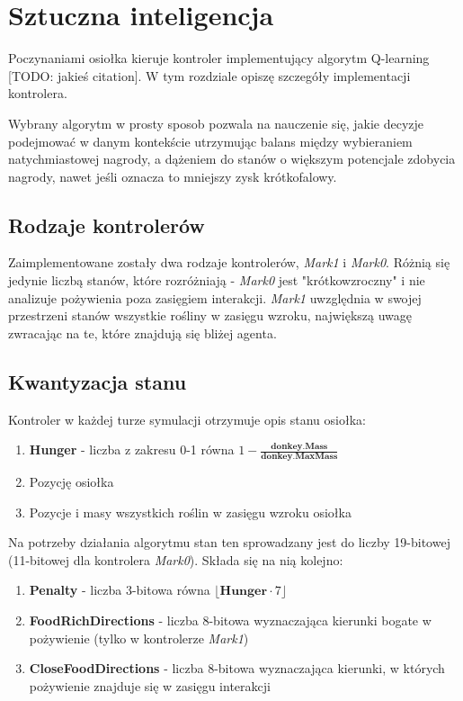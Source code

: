 \chapter{Sztuczna inteligencja}
Poczynaniami osiołka kieruje kontroler implementujący algorytm Q-learning [TODO: jakieś citation]. W tym rozdziale opiszę szczegóły implementacji kontrolera.

Wybrany algorytm w prosty sposob pozwala na nauczenie się, jakie decyzje podejmować w danym kontekście utrzymując balans między wybieraniem natychmiastowej nagrody, a dążeniem do stanów o większym potencjale zdobycia nagrody, nawet jeśli oznacza to mniejszy zysk krótkofalowy. 

\section{Rodzaje kontrolerów}
Zaimplementowane zostały dwa rodzaje kontrolerów, \textit{Mark1} i \textit{Mark0}. Różnią się jedynie liczbą stanów, które rozróżniają - \textit{Mark0} jest "krótkowzroczny" i nie analizuje pożywienia poza zasięgiem interakcji. \textit{Mark1} uwzględnia w swojej przestrzeni stanów wszystkie rośliny w zasięgu wzroku, największą uwagę zwracając na te, które znajdują się bliżej agenta.

\section{Kwantyzacja stanu}
Kontroler w każdej turze symulacji otrzymuje opis stanu osiołka:
\begin{enumerate}
    \item \textbf{Hunger} - liczba z zakresu 0-1 równa $1-\frac{\textbf{donkey.Mass}}{\textbf{donkey.MaxMass}}$
    \item Pozycję osiołka
    \item Pozycje i masy wszystkich roślin w zasięgu wzroku osiołka
\end{enumerate}
Na potrzeby działania algorytmu stan ten sprowadzany jest do liczby 19-bitowej (11-bitowej dla kontrolera \textit{Mark0}). Składa się na nią kolejno:
\begin{enumerate}
    \item \textbf{Penalty} - liczba 3-bitowa równa $\lfloor\textbf{Hunger}\cdot7\rfloor$
    \item \textbf{FoodRichDirections} - liczba 8-bitowa wyznaczająca kierunki bogate w pożywienie (tylko w kontrolerze \textit{Mark1})
    \item \textbf{CloseFoodDirections} - liczba 8-bitowa wyznaczająca kierunki, w których pożywienie znajduje się w zasięgu interakcji
\end{enumerate}

